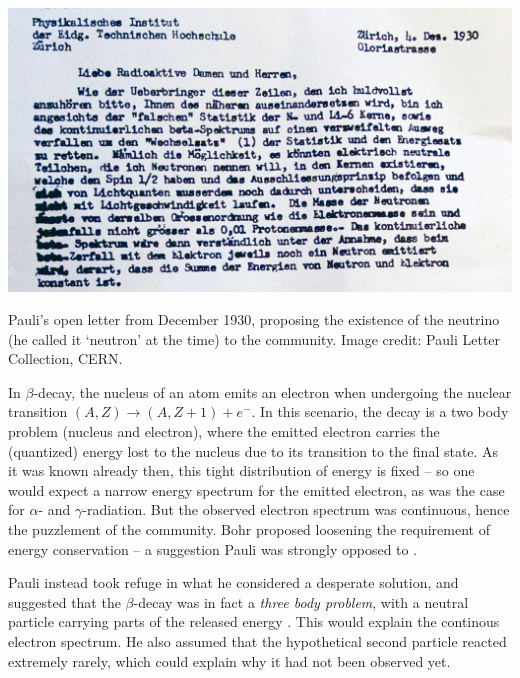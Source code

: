 \documentclass[
    a4paper, %
    fontsize=10pt, %
    twoside=false, %
    numbers=noenddot, %
    fontmethod=tex,
]{kaobook}
\begin{document}
\begin{marginfigure}
    \includegraphics{theory/pauli_neutrino.jpg}
    \caption[Pauli's letter proposing the neutrino]{Pauli's open letter from December 1930, proposing the existence of the neutrino (he called it `neutron' at the time) to the community. Image credit: Pauli Letter Collection, CERN.}
\end{marginfigure}

In $\beta$-decay, the nucleus of an atom emits an electron when undergoing the nuclear transition $(A,Z)\rightarrow(A,Z+1) + e^-$. In this scenario, the decay is a two body problem (nucleus and electron), where the emitted electron carries the (quantized) energy lost to the nucleus due to its transition to the final state. As it was known already then, this tight distribution of energy is fixed -- so one would expect a narrow energy spectrum for the emitted electron, as was the case for $\alpha$- and $\gamma$-radiation. But the observed electron spectrum was continuous, hence the puzzlement of the community. Bohr proposed loosening the requirement of energy conservation -- a suggestion Pauli was strongly opposed to .

Pauli instead took refuge in what he considered a desperate solution, and suggested that the $\beta$-decay was in fact a \textit{three body problem}, with a neutral particle carrying parts of the released energy . This would explain the continous electron spectrum. He also assumed that the hypothetical second particle reacted extremely rarely, which could explain why it had not been observed yet.
\end{document}
